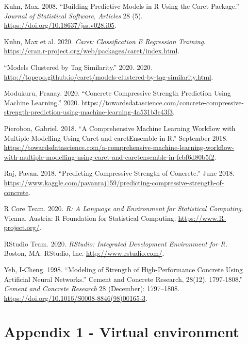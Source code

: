 \documentclass[
]{article}
\begin{document}
\leavevmode\hypertarget{ref-Kuhn2008}{}%
Kuhn, Max. 2008. ``Building Predictive Models in R Using the Caret
Package.'' \emph{Journal of Statistical Software, Articles} 28 (5).
\url{https://doi.org/10.18637/jss.v028.i05}.

\leavevmode\hypertarget{ref-caret}{}%
Kuhn, Max et al. 2020. \emph{Caret: Classification E Regression
Training}.
\url{https://cran.r-project.org/web/packages/caret/index.html}.

\leavevmode\hypertarget{ref-modelsClusters}{}%
``Models Clustered by Tag Similarity.'' 2020. 2020.
\url{http://topepo.github.io/caret/models-clustered-by-tag-similarity.html}.

\leavevmode\hypertarget{ref-Modukuru2020}{}%
Modukuru, Pranay. 2020. ``Concrete Compressive Strength Prediction Using
Machine Learning.'' 2020.
\url{https://towardsdatascience.com/concrete-compressive-strength-prediction-using-machine-learning-4a531b3c43f3}.

\leavevmode\hypertarget{ref-Pierobon2018}{}%
Pierobon, Gabriel. 2018. ``A Comprehensive Machine Learning Workflow
with Multiple Modelling Using Caret and caretEnsemble in R.'' September
2018.
\url{https://towardsdatascience.com/a-comprehensive-machine-learning-workflow-with-multiple-modelling-using-caret-and-caretensemble-in-fcbf6d80b5f2}.

\leavevmode\hypertarget{ref-Raj2018}{}%
Raj, Pavan. 2018. ``Predicting Compressive Strength of Concrete.'' June
2018.
\url{https://www.kaggle.com/pavanraj159/predicting-compressive-strength-of-concrete}.

\leavevmode\hypertarget{ref-RCore}{}%
R Core Team. 2020. \emph{R: A Language and Environment for Statistical
Computing}. Vienna, Austria: R Foundation for Statistical Computing.
\url{https://www.R-project.org/}.

\leavevmode\hypertarget{ref-RStudio}{}%
RStudio Team. 2020. \emph{RStudio: Integrated Development Environment
for R}. Boston, MA: RStudio, Inc. \url{http://www.rstudio.com/}.

\leavevmode\hypertarget{ref-Yeh1998}{}%
Yeh, I-Cheng. 1998. ``Modeling of Strength of High-Performance Concrete
Using Artificial Neural Networks.'' Cement and Concrete Research,
28(12), 1797-1808.'' \emph{Cement and Concrete Research} 28 (December):
1797--1808. \url{https://doi.org/10.1016/S0008-8846(98)00165-3}.

\newpage

\hypertarget{appendix1}{%
\section{Appendix 1 - Virtual environment}\label{appendix1}}
\end{document}
